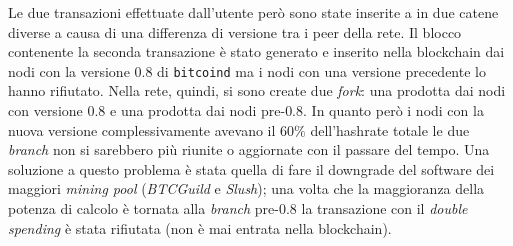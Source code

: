 Le due transazioni effettuate dall'utente però sono state inserite a in due catene diverse a causa di una differenza di versione tra i peer della rete. Il blocco contenente la seconda transazione è stato generato e inserito nella blockchain dai nodi con la versione $0.8$ di \texttt{bitcoind} ma i nodi con una versione precedente lo hanno rifiutato. Nella rete, quindi, si sono create due \textit{fork}: una prodotta dai nodi con versione $0.8$ e una prodotta dai nodi pre-$0.8$. In quanto però i nodi con la nuova versione complessivamente avevano il $60\%$ dell'hashrate totale le due \textit{branch} non si sarebbero più riunite o aggiornate con il passare del tempo. Una soluzione a questo problema è stata quella di fare il downgrade del software dei maggiori \textit{mining pool} (\textit{BTCGuild} e \textit{Slush}); una volta che la maggioranza della potenza di calcolo è tornata alla \textit{branch} pre-$0.8$ la transazione con il \textit{double spending} è stata rifiutata (non è mai entrata nella blockchain).

